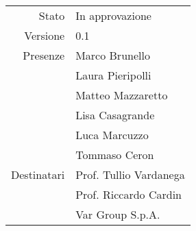 \begin{center}
\begin{tabular}{r|l}
	Stato & In approvazione \\
	Versione & 0.1 \\
	Presenze & Marco Brunello \\
	         & Laura Pieripolli \\
	         & Matteo Mazzaretto \\
	         & Lisa Casagrande \\
	         & Luca Marcuzzo \\
			 & Tommaso Ceron \\
	Destinatari & Prof. Tullio Vardanega \\
	            & Prof. Riccardo Cardin \\
				& Var Group S.p.A. \\
\end{tabular}
\end{center}